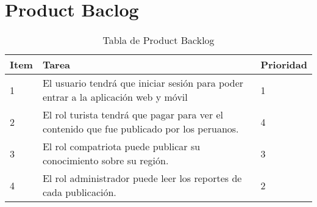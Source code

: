 \chapter{Product Baclog}
\begin{table}[htbp]
	\begin{center}
		\begin{tabular}{|l|p{5cm}|l|}
			\hline
			Item & Tarea & Prioridad \\
			\hline \hline
			1 & El usuario tendrá que iniciar sesión para poder entrar a la aplicación web y móvil			
			 & 1
			  \\ \hline
			2 & El rol turista tendrá que pagar para ver el contenido que fue publicado por los peruanos. & 4			
			 \\ \hline
			3 & El rol compatriota puede publicar su conocimiento sobre su región.			
			 & 3
			 \\ \hline
			4 & El rol administrador puede leer los reportes de cada publicación.						
			& 2	
			\\ \hline
		\end{tabular}
	\caption {Tabla de Product Backlog}
	\end{center}
\end{table}